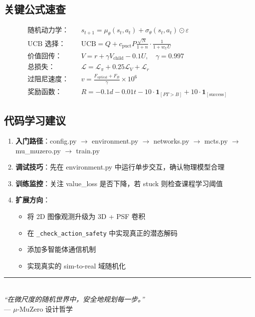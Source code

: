 \documentclass[UTF8, a4paper]{ctexart}
\begin{document}
\subsection{关键公式速查}

\begin{align}
\text{随机动力学：} & \quad s_{t+1} = \mu_\theta(s_t, a_t) + \sigma_\theta(s_t, a_t) \odot \varepsilon \\
\text{UCB 选择：} & \quad \text{UCB} = Q + c_{\text{puct}} P \frac{\sqrt{N}}{1+n} \cdot \frac{1}{1 + w_U U} \\
\text{价值回传：} & \quad V = r + \gamma V_{\text{child}} - 0.1 U, \quad \gamma = 0.997 \\
\text{总损失：} & \quad \mathcal{L} = \mathcal{L}_\pi + 0.25 \mathcal{L}_V + \mathcal{L}_r \\
\text{过阻尼速度：} & \quad v = \frac{F_{\text{optical}} + F_B}{\gamma} \times 10^6 \\
\text{奖励函数：} & \quad R = -0.1 d - 0.01 t - 10 \cdot \mathbf{1}_{[PT > B]} + 10 \cdot \mathbf{1}_{[\text{success}]}
\end{align}

\subsection{代码学习建议}

\begin{enumerate}[leftmargin=2em]
    \item \textbf{入门路径}：config.py $\to$ environment.py $\to$ networks.py $\to$ mcts.py $\to$ mu\_muzero.py $\to$ train.py
    \item \textbf{调试技巧}：先在 environment.py 中运行单步交互，确认物理模型合理
    \item \textbf{训练监控}：关注 value\_loss 是否下降，若 stuck 则检查课程学习阈值
    \item \textbf{扩展方向}：
    \begin{itemize}
        \item 将 2D 图像观测升级为 3D + PSF 卷积
        \item 在 \texttt{\_check\_action\_safety} 中实现真正的潜态解码
        \item 添加多智能体通信机制
        \item 实现真实的 sim-to-real 域随机化
    \end{itemize}
\end{enumerate}

\vspace{1cm}
\begin{center}
\rule{0.6\textwidth}{0.5pt}\\[0.5cm]
{\large\itshape ``在微尺度的随机世界中，安全地规划每一步。''}\\[0.3cm]
--- $\mu$-MuZero 设计哲学
\end{center}
\end{document}
